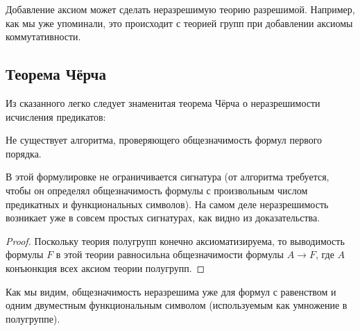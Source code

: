 Добавление аксиом может сделать неразрешимую
теорию разрешимой. Например, как мы уже упоминали, это
происходит с теорией групп при добавлении аксиомы
коммутативности.

\subsection*{Теорема Чёрча}%

Из сказанного легко следует знаменитая теорема Чёрча о
неразрешимости исчисления предикатов:

\begin{theorem}
        \label{church-theorem}
Не существует алгоритма, проверяющего общезначимость формул
первого порядка.
\end{theorem}

В этой формулировке не ограничивается сигнатура (от алгоритма
требуется, чтобы он определял общезначимость формулы с
произвольным числом предикатных и функциональных символов). На
самом деле неразрешимость возникает уже в совсем простых
сигнатурах, как видно из доказательства.

\begin{proof}
Поскольку теория полугрупп конечно аксиоматизируема, то
выводимость формулы $F$ в этой теории равносильна общезначимости
формулы $A\to F$, где $A$\т конъюнкция всех аксиом теории
полугрупп.
\end{proof}

Как мы видим, общезначимость неразрешима уже для формул с
равенством и одним двуместным функциональным символом
(используемым как умножение в полугруппе).

